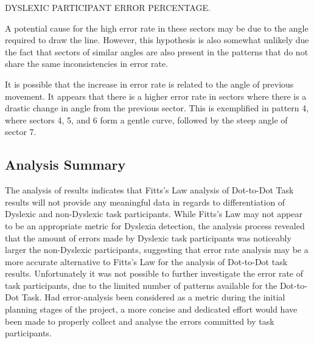 		DYSLEXIC PARTICIPANT ERROR PERCENTAGE.
		
		A potential cause for the high error rate in these sectors may be due to the angle required to draw the line. However, this hypothesis is also somewhat unlikely due the fact that sectors of similar angles are also present in the patterns that do not share the same inconsistencies in error rate. 
		
		It is possible that the increase in error rate is related to the angle of previous movement. It appears that there is a higher error rate in sectors where there is a drastic change in angle from the previous sector. This is exemplified in pattern 4, where sectors 4, 5, and 6 form a gentle curve, followed by the steep angle of sector 7.
		
	\subsection{Analysis Summary}
		The analysis of results indicates that Fitts’s Law analysis of Dot-to-Dot Task results will not provide any meaningful data in regards to differentiation of Dyslexic and non-Dyslexic task participants. While Fitts’s Law may not appear to be an appropriate metric for Dyslexia detection, the analysis process revealed that the amount of errors made by Dyslexic task participants was noticeably larger the non-Dyslexic participants, suggesting that error rate analysis may be a more accurate alternative to Fitts’s Law for the analysis of Dot-to-Dot task results. Unfortunately it was not possible to further investigate the error rate of task participants, due to the limited number of patterns available for the Dot-to-Dot Task. Had error-analysis been considered as a metric during the initial planning stages of the project, a more concise and dedicated effort would have been made to properly collect and analyse the errors committed by task participants.	
\newpage